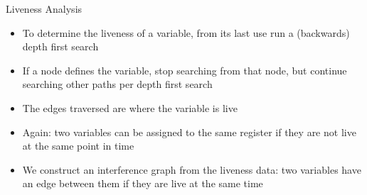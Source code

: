\documentclass[aspectratio=169]{beamer}
\begin{document}
\begin{frame}{Liveness Analysis}
    \begin{itemize}
        \item To determine the liveness of a variable, from its last use run a (backwards) depth first search
        \item If a node defines the variable, stop searching from that node, but continue searching other paths per depth first search
        \item The edges traversed are where the variable is live
        \pause
        \item Again: two variables can be assigned to the same register if they are not live at the same point in time
        \item We construct an interference graph from the liveness data: two variables have an edge between them if they are live at the same time
    \end{itemize}
\end{frame}
\end{document}
